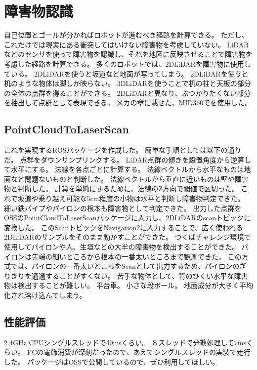 \section{障害物認識}
自己位置とゴールが分かればロボットが進むべき経路を計算できる。
ただし、これだけでは現実にある衝突してはいけない障害物を考慮していない。
LiDARなどのセンサを使って障害物を認識し、それを地図に反映させることで障害物を考慮した経路を計算できる。
多くのロボットでは、2DLiDARを障害物に使用している。
2DLiDARを使うと坂道など地面が写ってしまう。
2DLiDARを使うと机のような物体は脚しか映らない。
3DLiDARを使うことで机の柱と天板の部分の全体の点群を得ることができる。
2DLiDARと異なり、ぶつかりたくない部分を抽出して点群として表現できる。
メカの章に載せた、MID360でを使用した。

\subsection{PointCloudToLaserScan}
これを実現するROSパッケージを作成した。
簡単な手順としては以下の通りだ。
点群をダウンサンプリングする。
LiDAR点群の傾きを設置角度から逆算して水平にする。
法線を各点ごとに計算する。
法線ベクトルから水平なものは地面など問題ないものと判断した。
法線ベクトルから垂直に近いものは壁や障害物と判断した。
計算を単純にするために、法線のZ方向で閾値で区切った。
これで坂道や乗り越え可能な5cm程度の小物は水平と判断し障害物判定できた。
細い鉄パイプやパイロンの根本も障害物として判定できた。
出力した点群をOSSのPointCloudToLaserScanパッケージに入力し、2DLiDARのscanトピックに変換した。
このScanトピックをNavigation2に入力することで、広く使われる2DLiDARのサンプルをそのまま動かすことができた。
つくばチャレンジ環境で使用してパイロンや人、生垣などの大半の障害物を検出することができた。
パイロンは先端の細いところから根本の一番太いところまで観測できた。
この方式では、パイロンの一番太いところをScanとして出力するため、パイロンのぎりぎりを通過することがすくない。
苦手な物体として、背のひくい水平な障害物は検出することが難しい。
平台車。
小さな段ボール。
地面成分が大きく平均化され溶け込んでしまう。

\subsection{性能評価}
2.4GHz CPUシングルスレッドで40msくらい。
８スレッドで分散処理して7msくらい。
PCの電飾消費が深刻だったので、あえてシングルスレッドの実装で走行した。
パッケージはOSSで公開しているので、ぜひ利用してほしい。